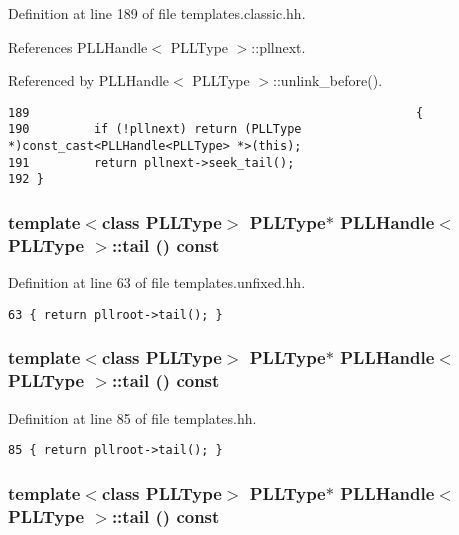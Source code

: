 Definition at line 189 of file templates.classic.hh.

References PLLHandle$<$ PLLType $>$::pllnext.

Referenced by PLLHandle$<$ PLLType $>$::unlink\_\-before().



\footnotesize\begin{verbatim}189                                                      { 
190         if (!pllnext) return (PLLType *)const_cast<PLLHandle<PLLType> *>(this); 
191         return pllnext->seek_tail(); 
192 } 
\end{verbatim}\normalsize 
{}
\subsubsection{\setlength{\rightskip}{0pt plus 5cm}template$<$class PLLType$>$ {\bf PLLType}$\ast$ PLLHandle$<$ {\bf PLLType} $>$::tail () const\hspace{0.3cm}{\tt  [inline]}}\label{classPLLHandle_a43}




Definition at line 63 of file templates.unfixed.hh.



\footnotesize\begin{verbatim}63 { return pllroot->tail(); } 
\end{verbatim}\normalsize 
{}
\subsubsection{\setlength{\rightskip}{0pt plus 5cm}template$<$class PLLType$>$ {\bf PLLType}$\ast$ PLLHandle$<$ {\bf PLLType} $>$::tail () const\hspace{0.3cm}{\tt  [inline]}}\label{classPLLHandle_a30}




Definition at line 85 of file templates.hh.



\footnotesize\begin{verbatim}85 { return pllroot->tail(); } 
\end{verbatim}\normalsize 
{}
\subsubsection{\setlength{\rightskip}{0pt plus 5cm}template$<$class PLLType$>$ {\bf PLLType}$\ast$ PLLHandle$<$ {\bf PLLType} $>$::tail () const\hspace{0.3cm}{\tt  [inline]}}\label{classPLLHandle_a17}




